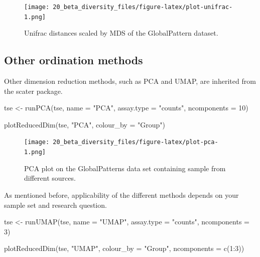\documentclass[
]{book}
\newenvironment{Shaded}{\begin{snugshade}}{\end{snugshade}}
\newcommand{\AttributeTok}[1]{\textcolor[rgb]{0.77,0.63,0.00}{#1}}
\newcommand{\DecValTok}[1]{\textcolor[rgb]{0.00,0.00,0.81}{#1}}
\newcommand{\FunctionTok}[1]{\textcolor[rgb]{0.00,0.00,0.00}{#1}}
\newcommand{\NormalTok}[1]{#1}
\newcommand{\OtherTok}[1]{\textcolor[rgb]{0.56,0.35,0.01}{#1}}
\newcommand{\SpecialCharTok}[1]{\textcolor[rgb]{0.00,0.00,0.00}{#1}}
\newcommand{\StringTok}[1]{\textcolor[rgb]{0.31,0.60,0.02}{#1}}
\begin{document}
\begin{figure}
\centering
\texttt{[image: 20\_beta\_diversity\_files/figure-latex/plot-unifrac-1.png]}
\caption{\label{fig:plot-unifrac}Unifrac distances scaled by MDS of the GlobalPattern dataset.}
\end{figure}

\hypertarget{other-ord-methods}{%
\subsection{Other ordination methods}\label{other-ord-methods}}

Other dimension reduction methods, such as PCA and UMAP, are inherited from the
scater package.

\begin{Shaded}
\begin{Highlighting}[]
\NormalTok{tse }\OtherTok{\textless{}{-}} \FunctionTok{runPCA}\NormalTok{(tse,}
              \AttributeTok{name =} \StringTok{"PCA"}\NormalTok{,}
              \AttributeTok{assay.type =} \StringTok{"counts"}\NormalTok{,}
              \AttributeTok{ncomponents =} \DecValTok{10}\NormalTok{)}

\FunctionTok{plotReducedDim}\NormalTok{(tse, }\StringTok{"PCA"}\NormalTok{,}
               \AttributeTok{colour\_by =} \StringTok{"Group"}\NormalTok{)}
\end{Highlighting}
\end{Shaded}

\begin{figure}
\centering
\texttt{[image: 20\_beta\_diversity\_files/figure-latex/plot-pca-1.png]}
\caption{\label{fig:plot-pca}PCA plot on the GlobalPatterns data set containing sample from different sources.}
\end{figure}

As mentioned before, applicability of the different methods depends on your
sample set and research question.

\begin{Shaded}
\begin{Highlighting}[]
\NormalTok{tse }\OtherTok{\textless{}{-}} \FunctionTok{runUMAP}\NormalTok{(tse,}
               \AttributeTok{name =} \StringTok{"UMAP"}\NormalTok{,}
               \AttributeTok{assay.type =} \StringTok{"counts"}\NormalTok{,}
               \AttributeTok{ncomponents =} \DecValTok{3}\NormalTok{)}

\FunctionTok{plotReducedDim}\NormalTok{(tse, }\StringTok{"UMAP"}\NormalTok{,}
               \AttributeTok{colour\_by =} \StringTok{"Group"}\NormalTok{,}
               \AttributeTok{ncomponents =} \FunctionTok{c}\NormalTok{(}\DecValTok{1}\SpecialCharTok{:}\DecValTok{3}\NormalTok{))}
\end{Highlighting}
\end{Shaded}
\end{document}
